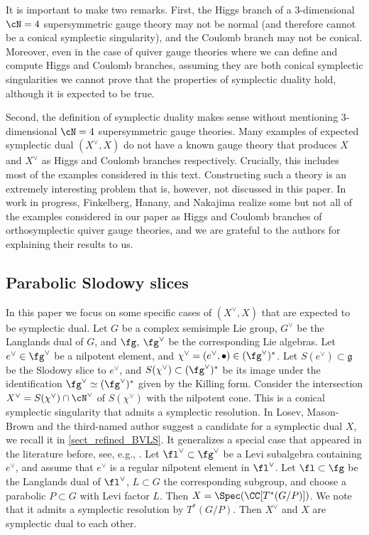 \documentclass[12pt]{amsart}
\begin{document}
    It is important to make two remarks. First, the Higgs branch of a $3$-dimensional $\cN=4$ supersymmetric gauge theory may not be normal (and therefore cannot be a conical symplectic singularity), and the Coulomb branch may not be conical. Moreover, even in the case of quiver gauge theories where we can define and compute Higgs and Coulomb branches, assuming they are both conical symplectic singularities we cannot prove that the properties of symplectic duality hold, although it is expected to be true.

    Second, the definition of symplectic duality makes sense without mentioning $3$-dimensional $\cN=4$ supersymmetric gauge theories. Many examples of expected symplectic dual $(X^\vee, X)$ do not have a known gauge theory that produces $X$ and $X^\vee$ as Higgs and Coulomb branches respectively. Crucially, this includes most of the examples considered in this text. Constructing such a theory is an extremely interesting problem that is, however, not discussed in this paper. In work in progress, Finkelberg, Hanany, and Nakajima realize some but not all of the examples considered in our paper as Higgs and Coulomb branches of orthosymplectic quiver gauge theories, and we are grateful to the authors for explaining their results to us. 
    
\subsection{Parabolic Slodowy slices}
    In this paper we focus on some specific cases of $(X^\vee, X)$ that are expected to be symplectic dual. Let $G$ be a complex semisimple Lie group, $G^\vee$ be the Langlands dual of $G$, and $\fg$, $\fg^\vee$ be the corresponding Lie algebras. Let $e^\vee\in \fg^\vee$ be a nilpotent element, and $\chi^\vee=(e^\vee, \bullet)\in (\fg^\vee)^*$. Let $S(e^\vee) \subset \mathfrak{g}$ be the Slodowy slice to $e^\vee$, and $S(\chi^\vee)\subset (\fg^\vee)^*$ be its image under the identification $\fg^\vee\simeq (\fg^\vee)^*$ given by the Killing form. Consider the intersection $X^\vee=S(\chi^\vee)\cap \cN^\vee$ of $S(\chi^\vee)$ with the nilpotent cone. This is a conical symplectic singularity that admits a symplectic resolution. In \cite[Section 9.3]{LMBM} Losev, Mason-Brown and the third-named author suggest a candidate for a symplectic dual $X$, we recall it in \cref{sect_refined_BVLS}. It generalizes a special case that appeared in the literature before, see, e.g., \cite[Section 10.2.2]{BPWII}. Let $\fl^\vee\subset \fg^\vee$ be a Levi subalgebra containing $e^\vee$, and assume that $e^\vee$ is a regular nilpotent element in $\fl^\vee$. Let $\fl\subset \fg$ be the Langlands dual of $\fl^\vee$, $L\subset G$ the corresponding subgroup, and choose a parabolic $P\subset G$ with Levi factor $L$. Then $X=\Spec(\CC[T^*(G/P)])$. We note that it admits a symplectic resolution by $T^* (G/P)$. Then $X^\vee$ and $X$ are symplectic dual to each other. 
\end{document}
